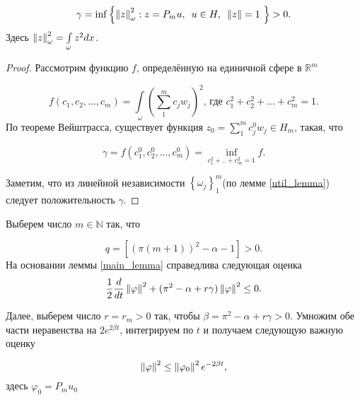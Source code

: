 \begin{lemma}\label{main_lemma}
    \begin{equation}
        \gamma = \inf{ \left\{ \left\lVert z\right\rVert^2_{\omega} : z = P_mu,\enskip u \in H, 
        \enskip \left\lVert z\right\rVert = 1 \ \right\} } > 0.
    \end{equation}
    Здесь $\left\lVert z\right\rVert^2_{\omega} = \int\limits_{\omega}{z^2dx}$.
\end{lemma}

\begin{proof}

    Рассмотрим функцию $f$, определённую на единичной сфере в $\mathbb{R}^m$

    \begin{equation}
       f(c_1, c_2, ..., c_m) = \int \limits_{\omega} {(\sum\limits_1^m {c_jw_j})^2}
       \text{, где } c_1^2 + c_2^2 + ... + c^2_m = 1.
    \end{equation}
    По теореме Вейштрасса, существует функция 
    $z_0 = \sum\limits_1^m {c_j^0 w_j} \in H_m$, такая, что

    \begin{equation}
       \gamma = f(c_1^0, c_2^0, ..., c_m^0) = \inf \limits_{c_1^2 + .. + c_m^2 =
       1} {f}.
    \end{equation}

    Заметим, что из линейной независимости 
    $\left\{ \omega_j \right\}^m_1$(по лемме \ref{util_lemma}) следует 
    положительность $\gamma$.

\end{proof}

\par
\vspace{2ex}

Выберем число $m \in \mathbb{N}$ так, что

\begin{equation}
    q = [(\pi(m + 1))^2 - \alpha - 1] > 0.
\end{equation}
На основании леммы \ref{main_lemma} справедлива следующая оценка
\begin{equation*}
    \frac{1}{2} \frac{d}{dt} \left\lVert\varphi\right\rVert^2 + (\pi^2 - \alpha + r\gamma) 
    \left\lVert\varphi\right\rVert^2 \le 0.
\end{equation*}

Далее, выберем число $r = r_m > 0$ так, чтобы
$\beta = \pi^2 - \alpha + r\gamma > 0$.
Умножим обе части неравенства на $2e^{2\beta t}$, интегрируем по $t$ и 
получаем следующую важную оценку

\begin{equation}\label{phi_mark}
    \left\lVert\varphi\right\rVert^2 \le \left\lVert\varphi_0\right\rVert^2 e^{-2\beta t},
\end{equation}
здесь $\varphi_0 = P_m u_0$
\vspace{2em}

